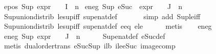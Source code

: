 \begin{isabellebody}
\ e{}{\isacharunderscore}{\kern0pt}pos{\isacharcolon}{\kern0pt}\ {\isachardoublequoteopen}Sup\ {\isacharparenleft}{\kern0pt}{\isacharparenleft}{\kern0pt}expr{\isacharunderscore}{\kern0pt}{}\ {\isasymcirc}\ {\isasymPhi}{\isacharparenright}{\kern0pt}\ {\isacharbackquote}{\kern0pt}\ I{\isacharparenright}{\kern0pt}\ {\isasymle}\ n{}{\isachardoublequoteclose}\isanewline
{}\ e{}{\isacharunderscore}{\kern0pt}neg{\isacharcolon}{\kern0pt}\ {\isachardoublequoteopen}Sup\ {\isacharparenleft}{\kern0pt}{\isacharparenleft}{\kern0pt}eSuc\ {\isasymcirc}\ expr{\isacharunderscore}{\kern0pt}{}\ {\isasymcirc}\ {\isasymPhi}{\isacharparenright}{\kern0pt}\ {\isacharbackquote}{\kern0pt}\ J{\isacharparenright}{\kern0pt}\ {\isasymle}\ n{}{\isachardoublequoteclose}\isanewline
\ \ \ \ \isamarkupfalse%
\ Sup{\isacharunderscore}{\kern0pt}union{\isacharunderscore}{\kern0pt}distrib\ le{\isacharunderscore}{\kern0pt}sup{\isacharunderscore}{\kern0pt}iff\ sup{\isacharunderscore}{\kern0pt}enat{\isacharunderscore}{\kern0pt}def\isanewline
\ \ \ \ \ \isamarkupfalse%
\ {\isacharparenleft}{\kern0pt}simp\ add{\isacharcolon}{\kern0pt}\ Sup{\isacharunderscore}{\kern0pt}le{\isacharunderscore}{\kern0pt}iff{\isacharparenright}{\kern0pt}\isanewline
\ \ \ \ \isamarkupfalse%
\ Sup{\isacharunderscore}{\kern0pt}union{\isacharunderscore}{\kern0pt}distrib\ le{\isacharunderscore}{\kern0pt}sup{\isacharunderscore}{\kern0pt}iff\ sup{\isacharunderscore}{\kern0pt}enat{\isacharunderscore}{\kern0pt}def\ e{}{\isacharunderscore}{\kern0pt}eq\ e{}{\isacharunderscore}{\kern0pt}le\isanewline
\ \ \ \ \isamarkupfalse%
\ metis\isanewline
\isanewline
\ \ \isamarkupfalse%
\ e{}{\isacharunderscore}{\kern0pt}neg\ \isamarkupfalse%
\ e{}{\isacharunderscore}{\kern0pt}neg{\isacharcolon}{\kern0pt}\ {\isachardoublequoteopen}Sup\ {\isacharparenleft}{\kern0pt}{\isacharparenleft}{\kern0pt}expr{\isacharunderscore}{\kern0pt}{}\ {\isasymcirc}\ {\isasymPhi}{\isacharparenright}{\kern0pt}\ {\isacharbackquote}{\kern0pt}\ J{\isacharparenright}{\kern0pt}\ {\isasymle}\ n{}{\isachardoublequoteclose}\isanewline
\ \ \ \ \isamarkupfalse%
\ Sup{\isacharunderscore}{\kern0pt}enat{\isacharunderscore}{\kern0pt}def\ eSuc{\isacharunderscore}{\kern0pt}def\isanewline
\ \ \ \ \isamarkupfalse%
\ {\isacharparenleft}{\kern0pt}metis\ dual{\isacharunderscore}{\kern0pt}order{\isachardot}{\kern0pt}trans\ eSuc{\isacharunderscore}{\kern0pt}Sup\ i{}{\isacharunderscore}{\kern0pt}lb\ ile{\isacharunderscore}{\kern0pt}eSuc\ image{\isacharunderscore}{\kern0pt}comp{\isacharparenright}{\kern0pt}\isanewline

\end{isabellebody}
